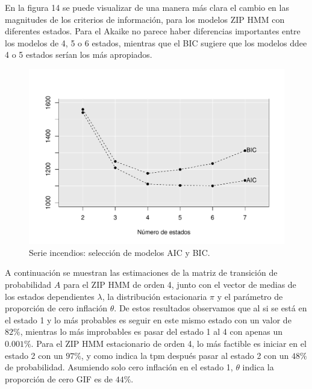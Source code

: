 \documentclass[a4paper]{article}\usepackage[]{graphicx}\usepackage[]{color}
\makeatletter
\def\maxwidth{ %
  \ifdim\Gin@nat@width>\linewidth
    \linewidth
  \else
    \Gin@nat@width
  \fi
}
\newenvironment{knitrout}{}{} %
\makeatother
\begin{document}
En la figura 14 se puede visualizar de una manera más clara el cambio en las magnitudes de los criterios de información, para los modelos ZIP HMM con diferentes estados. Para el Akaike no parece haber diferencias importantes entre los modelos de 4, 5 o 6 estados, mientras que el BIC sugiere que los modelos ddee 4 o 5 estados serían los más apropiados.

\begin{knitrout}
\color{fgcolor}\begin{figure}[h]
\includegraphics[width=\maxwidth]{figure/unnamed-chunk-41-1} \caption[Serie incendios]{Serie incendios: selección de modelos AIC y BIC.}\label{fig:unnamed-chunk-41}
\end{figure}


\end{knitrout}

A continuación se muestran las estimaciones de la matriz de transición de probabilidad $A$ para el ZIP HMM de orden 4, junto con el vector de medias de los estados dependientes $\lambda$, la distribución estacionaria $\pi$ y el parámetro de proporción de cero inflación $\theta$. De estos resultados observamos que al si se está en el estado 1 y lo más probables es seguir en este mismo estado con un valor de $82 \%$, mientras lo más improbables es pasar del estado 1 al 4 con apenas un $0.001 \%$. Para el ZIP HMM estacionario de orden 4, lo más factible es iniciar en el estado 2 con un $97 \%$, y como indica la tpm después pasar al estado 2 con un $48 \%$ de probabilidad. Asumiendo solo cero inflación en el estado 1, $\theta$ indica la proporción de cero GIF es de $44 \%$.
\end{document}
